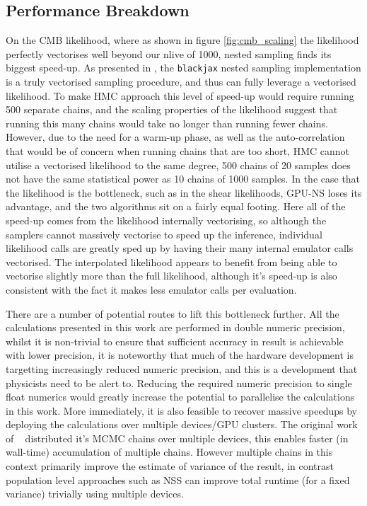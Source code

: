 \documentclass[twocolumn]{openjournal}
\begin{document}
\subsection{Performance Breakdown}
On the CMB likelihood, where as shown in figure \ref{fig:cmb_scaling} the likelihood perfectly vectorises well beyond our n\textunderscore live of 1000, nested sampling finds its biggest speed-up. As presented in \cite{NSSyallup}, the \texttt{blackjax} nested sampling implementation is a truly vectorised sampling procedure, and thus can fully leverage a vectorised likelihood. To make HMC approach this level of speed-up would require running 500 separate chains, and the scaling properties of the likelihood suggest that running this many chains would take no longer than running fewer chains. However, due to the need for a warm-up phase, as well as the auto-correlation that would be of concern when running chains that are too short, HMC cannot utilise a vectorised likelihood to the same degree, 500 chains of 20 samples does not have the same statistical power as 10 chains of 1000 samples.
In the case that the likelihood is the bottleneck, such as in the shear likelihoods, GPU-NS loses its advantage, and the two algorithms sit on a fairly equal footing. Here all of the speed-up comes from the likelihood internally vectorising, so although the samplers cannot massively vectorise to speed up the inference, individual likelihood calls are greatly sped up by having their many internal emulator calls vectorised. The interpolated likelihood appears to benefit from being able to vectorise slightly more than the full likelihood, although it's speed-up is also consistent with the fact it makes less emulator calls per evaluation. 

There are a number of potential routes to lift this bottleneck further. All the calculations presented in this work are performed in double numeric precision, whilst it is non-trivial to ensure that sufficient accuracy in result is achievable with lower precision, it is noteworthy that much of the hardware development is targetting increasingly reduced numeric precision, and this is a development that physicists need to be alert to. Reducing the required numeric precision to single float numerics would greatly increase the potential to parallelise the calculations in this work. More immediately, it is also feasible to recover massive speedups by deploying the calculations over multiple devices/GPU clusters. The original work of ~\citep{Piras_2024} distributed it's MCMC chains over multiple devices, this enables faster (in wall-time) accumulation of multiple chains. However multiple chains in this context primarily improve the estimate of variance of the result, in contrast population level approaches such as NSS can improve total runtime (for a fixed variance) trivially using multiple devices.
\end{document}
